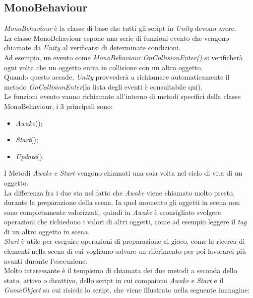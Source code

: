 \subsection{MonoBehaviour}
\textit{MonoBehaviour}\cite{Mono} è la classe di base che tutti gli script in \textit{Unity} devono avere.\\La classe MonoBehaviour espone una serie di funzioni evento che vengono chiamate da \textit{Unity} al verificarsi di determinate condizioni.\\
Ad esempio, un evento come \textit{MonoBehaviour.OnCollisionEnter()} si verificherà ogni volta che un oggetto entra in collisione con un altro oggetto.
\\Quando questo accade, \textit{Unity} provvederà a richiamare automaticamente il metodo \textit{OnCollisionEnter}(la lista degli eventi è consultabile qui\cite{Eventi}).
\\Le funzioni evento vanno richiamate all'interno di metodi specifici della classe MonoBehaviour, i 3 principali sono:
\begin{itemize}
    \item \textit{Awake}();
    \item \textit{Start}();
    \item \textit{Update}().
\end{itemize}
I Metodi \textit{\textit{Awake}} e \textit{\textit{Start}} vengono chiamati una sola volta nel ciclo di vita di un oggetto. 
\\La differenza fra i due sta nel fatto che \textit{\textit{Awake}} viene chiamato molto presto, durante la preparazione della scena. In quel momento gli oggetti in scena non sono completamente valorizzati, quindi in \textit{Awake} è sconsigliato svolgere operazioni che richiedono i valori di altri oggetti, come ad esempio leggere il \textit{tag} di un altro oggetto in scena.
\\\textit{\textit{Start}} è utile per eseguire operazioni di preparazione al gioco, come la ricerca di elementi nella scena di cui vogliamo salvare un riferimento per poi lavorarci più avanti durante l'esecuzione.
\\Molto interessante è il tempismo di chiamata dei due metodi a seconda dello stato, attivo o disattivo, dello script in cui compaiono \textit{Awake} e \textit{Start} e il \textit{GameObject} su cui risiede lo script, che viene illustrato nella seguente immagine:

